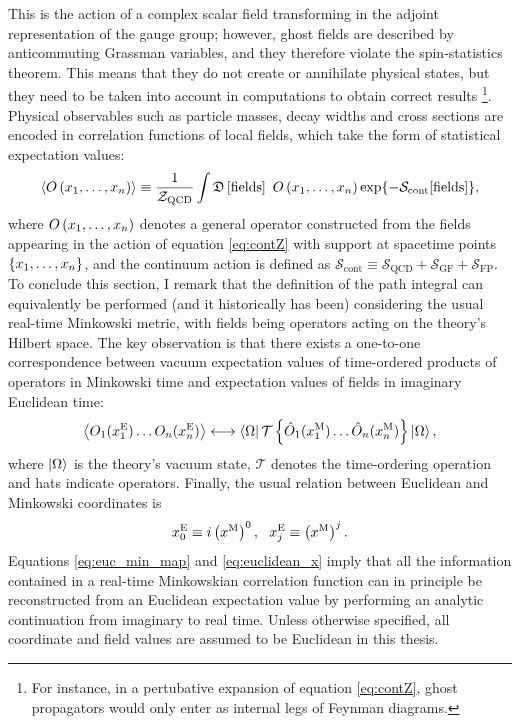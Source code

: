 This is the action of a complex scalar field transforming in the adjoint representation
of the gauge group; however, ghost fields are described by anticommuting 
Grassman variables, and they therefore violate the spin-statistics theorem.
This means that they do not create or annihilate physical states, but they need
to be taken into account in computations to obtain correct results 
\footnote{For instance, in a pertubative expansion of 
equation \eqref{eq:contZ}, ghost propagators would only enter as
internal legs of Feynman diagrams.}.\\
Physical observables such as particle masses, decay widths and cross sections 
are encoded in correlation functions of local fields, which take the form
of statistical expectation values:
\begin{equation}
	\left\langle O\left( x_1,\dots,x_n\right)\right\rangle\equiv\frac{1}{\mathcal{Z}_\mathrm{QCD}}
\int\mathfrak{D}\left[\mathrm{fields}\right]\ O\left( x_1,\dots,x_n\right)\exp{-\mathcal{S}_\mathrm{cont}[\text{fields}]},\label{eq:expv}
\end{equation}
where $\displaystyle O\left( x_1,\dots, x_n \right)$ denotes a general operator 
constructed from the fields appearing in the action of equation \eqref{eq:contZ}
with support at spacetime points $\displaystyle \left\{ x_1,\dots,x_n \right\}$, and 
the continuum action is defined as
$\mathcal{S}_\mathrm{cont}\equiv\mathcal{S}_\mathrm{QCD}+\mathcal{S}_\mathrm{GF}+\mathcal{S}_\mathrm{FP}$. 
To conclude this section, I remark that the definition of the path integral can
equivalently be performed (and it historically has been) considering the usual 
real-time Minkowski metric, with fields being operators acting on the theory's 
Hilbert space. The key observation is that there exists a one-to-one correspondence 
between vacuum expectation values of time-ordered products of operators in Minkowski 
time and expectation values of fields in imaginary Euclidean time:
\begin{equation}
	\left\langle O_1(x_1^\mathrm{E})\dots O_n(x_n^\mathrm{E})\right\rangle \longleftrightarrow 
	\bra{\Omega}\mathcal{T}\left\{\hat{O}_1(x_1^\mathrm{M})\dots\hat{O}_n(x_n^\mathrm{M})\right\} \ket{\Omega},\label{eq:euc_min_map}
\end{equation}
where $\ket{\Omega}$ is the theory's vacuum state, $\mathcal{T}$ denotes the 
time-ordering operation and hats indicate operators. Finally, the usual relation
between Euclidean and Minkowski coordinates is
\begin{equation}
	x^\mathrm{E}_0\equiv i \left( x^\mathrm{M}\right)^0,\ \ x^\mathrm{E}_j\equiv \left( x^\mathrm{M}\right)^j.\label{eq:euclidean_x}
\end{equation}
Equations \eqref{eq:euc_min_map} and \eqref{eq:euclidean_x} imply that all the information
contained in a real-time Minkowskian correlation function can in principle be reconstructed
from an Euclidean expectation value by performing an analytic continuation from 
imaginary to real time. Unless otherwise specified, all coordinate and field 
values are assumed to be Euclidean in this thesis.
